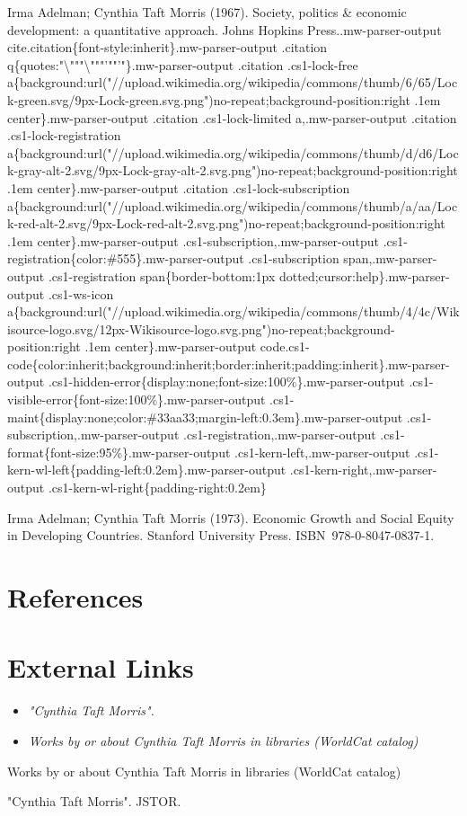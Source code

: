 Irma Adelman; Cynthia Taft Morris (1967). Society, politics \& economic
development: a quantitative approach. Johns Hopkins
Press..mw-parser-output
cite.citation\{font-style:inherit\}.mw-parser-output .citation
q\{quotes:"\textbackslash{}"""\textbackslash{}"""'""'"\}.mw-parser-output
.citation .cs1-lock-free
a\{background:url("//upload.wikimedia.org/wikipedia/commons/thumb/6/65/Lock-green.svg/9px-Lock-green.svg.png")no-repeat;background-position:right
.1em center\}.mw-parser-output .citation .cs1-lock-limited
a,.mw-parser-output .citation .cs1-lock-registration
a\{background:url("//upload.wikimedia.org/wikipedia/commons/thumb/d/d6/Lock-gray-alt-2.svg/9px-Lock-gray-alt-2.svg.png")no-repeat;background-position:right
.1em center\}.mw-parser-output .citation .cs1-lock-subscription
a\{background:url("//upload.wikimedia.org/wikipedia/commons/thumb/a/aa/Lock-red-alt-2.svg/9px-Lock-red-alt-2.svg.png")no-repeat;background-position:right
.1em center\}.mw-parser-output .cs1-subscription,.mw-parser-output
.cs1-registration\{color:\#555\}.mw-parser-output .cs1-subscription
span,.mw-parser-output .cs1-registration span\{border-bottom:1px
dotted;cursor:help\}.mw-parser-output .cs1-ws-icon
a\{background:url("//upload.wikimedia.org/wikipedia/commons/thumb/4/4c/Wikisource-logo.svg/12px-Wikisource-logo.svg.png")no-repeat;background-position:right
.1em center\}.mw-parser-output
code.cs1-code\{color:inherit;background:inherit;border:inherit;padding:inherit\}.mw-parser-output
.cs1-hidden-error\{display:none;font-size:100\%\}.mw-parser-output
.cs1-visible-error\{font-size:100\%\}.mw-parser-output
.cs1-maint\{display:none;color:\#33aa33;margin-left:0.3em\}.mw-parser-output
.cs1-subscription,.mw-parser-output .cs1-registration,.mw-parser-output
.cs1-format\{font-size:95\%\}.mw-parser-output
.cs1-kern-left,.mw-parser-output
.cs1-kern-wl-left\{padding-left:0.2em\}.mw-parser-output
.cs1-kern-right,.mw-parser-output
.cs1-kern-wl-right\{padding-right:0.2em\}

Irma Adelman; Cynthia Taft Morris (1973). Economic Growth and Social
Equity in Developing Countries. Stanford University Press.
ISBN~978-0-8047-0837-1.

\section{References}\label{references}

\section{External Links}\label{external-links}

\begin{itemize}
\item
  \emph{"Cynthia Taft Morris".}
\item
  \emph{Works by or about Cynthia Taft Morris in libraries (WorldCat
  catalog)}
\end{itemize}

Works by or about Cynthia Taft Morris in libraries (WorldCat catalog)

"Cynthia Taft Morris". JSTOR.
